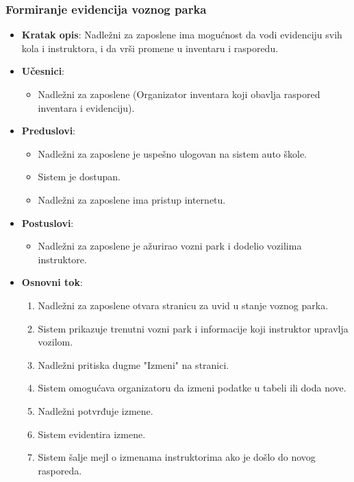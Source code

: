 \subsubsection{Formiranje evidencija voznog parka}
\label{subsubsec:vozni park}
\begin{itemize}
  \item \textbf{Kratak opis}: Nadležni za zaposlene ima mogućnost da vodi evidenciju svih kola i instruktora, i da vrši promene u inventaru i rasporedu.
  \item \textbf{Učesnici}:
    \begin{itemize}
    \item Nadležni za zaposlene (Organizator inventara koji obavlja raspored inventara i evidenciju).
    \end{itemize}
  \item \textbf{Preduslovi}:
    \begin{itemize}
    \item  Nadležni za zaposlene je uspešno ulogovan na sistem auto škole.
    \item  Sistem je dostupan.
    \item  Nadležni za zaposlene ima pristup internetu.
    \end{itemize}
  \item \textbf{Postuslovi}:
      \begin{itemize}
      \item  Nadležni za zaposlene je ažurirao vozni park i dodelio vozilima instruktore.
      \end{itemize}
  \item \textbf{Osnovni tok}:
      \begin{enumerate}
        \item Nadležni za zaposlene otvara stranicu za uvid  u stanje voznog parka.
        \item Sistem prikazuje trenutni vozni park i informacije koji instruktor upravlja vozilom.
        \item Nadležni pritiska dugme "Izmeni"  na stranici.
        \item Sistem omogućava organizatoru da izmeni podatke u tabeli ili doda nove.
        \item Nadležni potvrđuje izmene.
        \item Sistem evidentira izmene.
        \item Sistem šalje mejl o izmenama instruktorima ako je došlo do novog rasporeda.
      \end{enumerate}


\end{itemize}
